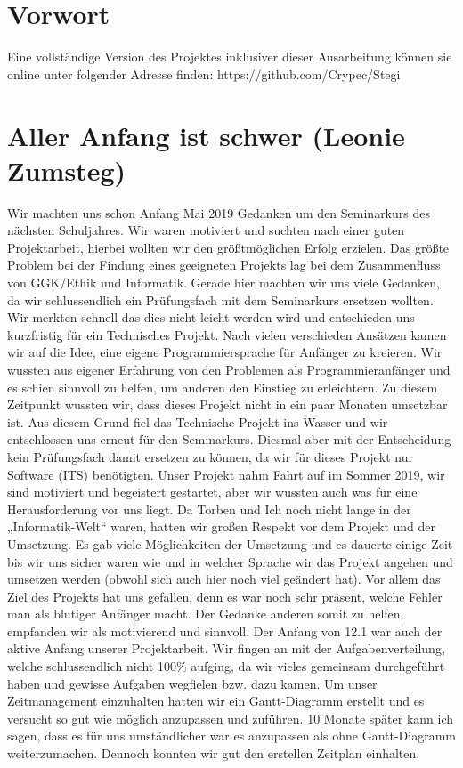 \documentclass[a4paper, 12pt]{article}
\begin{document}
\clearpage
\tableofcontents
\clearpage


\section{Vorwort}
Eine vollständige Version des Projektes inklusiver dieser Ausarbeitung können sie online unter folgender Adresse finden: https://github.com/Crypec/Stegi

\section{Aller Anfang ist schwer (Leonie Zumsteg)}
Wir machten uns schon Anfang Mai 2019 Gedanken um den Seminarkurs des nächsten Schuljahres. Wir waren motiviert und suchten nach einer guten Projektarbeit, hierbei wollten wir den größtmöglichen Erfolg erzielen. Das größte Problem bei der Findung eines geeigneten Projekts lag bei dem Zusammenfluss von GGK/Ethik und Informatik. Gerade hier machten wir uns viele Gedanken, da wir schlussendlich ein Prüfungsfach mit dem Seminarkurs ersetzen wollten. Wir merkten schnell das dies nicht leicht werden wird und entschieden uns kurzfristig für ein Technisches Projekt. Nach vielen verschieden Ansätzen kamen wir auf die Idee, eine eigene Programmiersprache für Anfänger zu kreieren. Wir wussten aus eigener Erfahrung von den Problemen als Programmieranfänger und es schien sinnvoll zu helfen, um anderen den Einstieg zu erleichtern. Zu diesem Zeitpunkt wussten wir, dass dieses Projekt nicht in ein paar Monaten umsetzbar ist. Aus diesem Grund fiel das Technische Projekt ins Wasser und wir entschlossen uns erneut für den Seminarkurs. Diesmal aber mit der Entscheidung kein Prüfungsfach damit ersetzen zu können, da wir für dieses Projekt nur Software (ITS) benötigten. 
Unser Projekt nahm Fahrt auf im Sommer 2019, wir sind motiviert und begeistert gestartet, aber wir wussten auch was für eine Herausforderung vor uns liegt. Da Torben und Ich noch nicht lange in der „Informatik-Welt“ waren, hatten wir großen Respekt vor dem Projekt und der Umsetzung. Es gab viele Möglichkeiten der Umsetzung und es dauerte einige Zeit bis wir uns sicher waren wie und in welcher Sprache wir das Projekt angehen und umsetzen werden (obwohl sich auch hier noch viel geändert hat). Vor allem das Ziel des Projekts hat uns gefallen, denn es war noch sehr präsent, welche Fehler man als blutiger Anfänger macht. Der Gedanke anderen somit zu helfen, empfanden wir als motivierend und sinnvoll. 
Der Anfang von 12.1 war auch der aktive Anfang unserer Projektarbeit. Wir fingen an mit der Aufgabenverteilung, welche schlussendlich nicht 100\% aufging, da wir vieles gemeinsam durchgeführt haben und gewisse Aufgaben wegfielen bzw. dazu kamen. Um unser Zeitmanagement einzuhalten hatten wir ein Gantt-Diagramm erstellt und es versucht so gut wie möglich anzupassen und zuführen. 10 Monate später kann ich sagen, dass es für uns umständlicher war es anzupassen als ohne Gantt-Diagramm weiterzumachen. Dennoch konnten wir gut den erstellen Zeitplan einhalten.  
\end{document}
